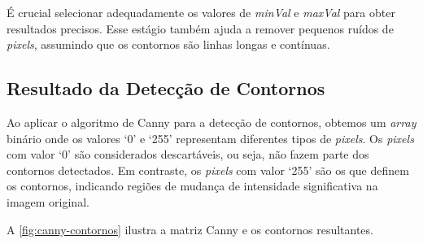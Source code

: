 É crucial selecionar adequadamente os valores de \textit{minVal} e \textit{maxVal} para obter resultados precisos. Esse estágio também ajuda a remover pequenos ruídos de \textit{pixels}, assumindo que os contornos são linhas longas e contínuas.

\subsection{Resultado da Detecção de Contornos}
\label{sec:resultado-deteccao-contornos}

Ao aplicar o algoritmo de Canny para a detecção de contornos, obtemos um \textit{array} binário onde os valores `0' e `255' representam diferentes tipos de \textit{pixels}. Os \textit{pixels} com valor `0' são considerados descartáveis, ou seja, não fazem parte dos contornos detectados. Em contraste, os \textit{pixels} com valor `255' são os que definem os contornos, indicando regiões de mudança de intensidade significativa na imagem original.

A \autoref{fig:canny-contornos} ilustra a matriz Canny e os contornos resultantes.

